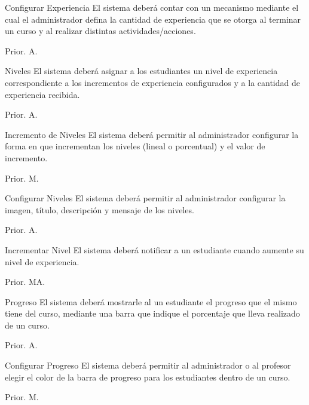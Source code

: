 \begin{RF}{Configurar Experiencia}{%
    El sistema deberá contar con un mecanismo mediante el cual el administrador defina la cantidad de experiencia que se otorga al terminar un curso y al realizar distintas actividades/acciones.}
    \item[] Prior. A. %
\end{RF}

\begin{RF}{Niveles}{%
    El sistema deberá asignar a los estudiantes un nivel de experiencia correspondiente a los incrementos de experiencia configurados y a la cantidad de experiencia recibida. }
    \item[] Prior. A. %
\end{RF}

\begin{RF}{Incremento de Niveles}{%
    El sistema deberá permitir al administrador configurar la forma en que incrementan los niveles (lineal o porcentual) y el valor de incremento. }
    \item[] Prior. M. %
\end{RF}

\begin{RF}{Configurar Niveles}{%
    El sistema deberá permitir al administrador configurar la imagen, título, descripción y mensaje de los niveles. }
    \item[] Prior. A. %
\end{RF}

\begin{RF}{Incrementar Nivel}{%
    El sistema deberá notificar a un estudiante cuando aumente su nivel de experiencia.}
    \item[] Prior. MA. %
\end{RF}

\begin{RF}{Progreso}{%
    El sistema deberá mostrarle al un estudiante el progreso que el mismo tiene del curso, mediante una barra que indique el porcentaje que lleva realizado de un curso.}
    \item[] Prior. A. %
\end{RF}

\begin{RF}{Configurar Progreso}{%
    El sistema deberá permitir al administrador o al profesor elegir el color de la barra de progreso para los estudiantes dentro de un curso.}
    \item[] Prior. M. %
\end{RF}

